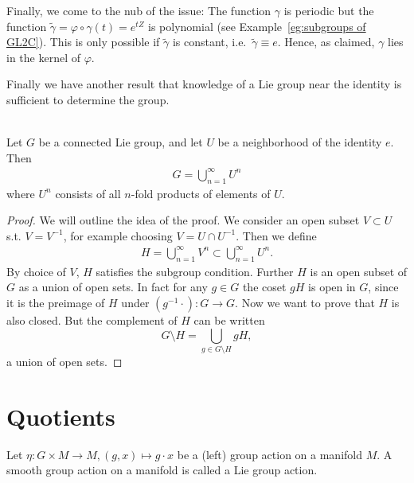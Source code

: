Finally, we come to the nub of the issue: The function $\gamma$ is periodic but the function $\tilde{\gamma} = \varphi\circ \gamma(t) = e^{tZ}$ is polynomial (see Example~\ref{eg:subgroups of GL2C}).
This is only possible if $\tilde{\gamma}$ is constant, i.e.\ $\tilde{\gamma} \equiv e$.
Hence, as claimed, $\gamma$ lies in the kernel of $\varphi$.





Finally we have another result that knowledge of a Lie group near the identity is sufficient to determine the group.
\begin{theorem}
\label{thm:local generation}
\textup{\cite[3.18]{Warner1983}}\\
Let $G$ be a connected Lie group, and let $U$ be a neighborhood of the identity $e$. Then 
\begin{align*}
G= \bigcup_{n=1}^{\infty} U^n
\end{align*}
where $U^n$ consists of all $n$-fold products of elements of $U$.
\end{theorem}

\begin{proof}
We will outline the idea of the proof. We consider an open subset $V \subset U$ s.t. $V=V^{-1}$, for example choosing $V = U\cap U^{-1}$. Then we define 
\begin{align*}
H = \bigcup_{n=1}^{\infty} V^n \subset \bigcup_{n=1}^{\infty} U^n.
\end{align*}
By choice of $V$, $H$ satisfies the subgroup condition. Further $H$ is an open subset of $G$ as a union of open sets. In fact for any $g \in G$ the coset $gH$ is open in $G$, since it is the preimage of $H$ under $(g^{-1} \cdot) : G \to G$.
Now we want to prove that $H$ is also closed. But the complement of $H$ can be written
\[
G \setminus H = \bigcup_{g \in G \setminus H} gH,
\]
a union of open sets.
\end{proof}




\section{Quotients}
\begin{definition}
Let $\eta \colon G \times M \to M, (g,x) \mapsto g \cdot x$ be a (left) group action on a manifold $M$. A smooth group action on a manifold is called a Lie group action.
\end{definition}

